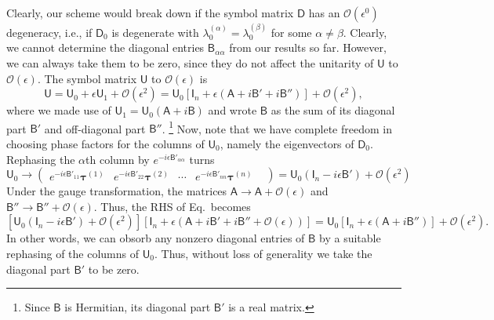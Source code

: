 Clearly, our scheme would break down if the symbol matrix $\mathsf{D}$ has an $\mathcal{O}(\epsilon^{0})$ degeneracy, i.e., if $\mathsf{D}_{0}$ is degenerate with $\lambda_{0}^{(\alpha)} = \lambda_{0}^{(\beta)}$ for some $\alpha \neq \beta$.
Clearly, we cannot determine the diagonal entries $\mathsf{B}_{\alpha\alpha}$ from our results so far.
However, we can always take them to be zero, since they do not affect the unitarity of $\mathsf{U}$ to $\mathcal{O}(\epsilon)$.
The symbol matrix $\mathsf{U}$ to $\mathcal{O}(\epsilon)$ is
%
\begin{equation}
  \mathsf{U} = \mathsf{U}_{0} + \epsilon \mathsf{U}_{1} + \mathcal{O}(\epsilon^{2}) = \mathsf{U}_{0}\left[\mathsf{I}_{n} + \epsilon\left(\mathsf{A} + i\mathsf{B}' + i\mathsf{B}'' \right)\right] + \mathcal{O}(\epsilon^{2}),
\end{equation}
%
where we made use of $\mathsf{U}_{1} = \mathsf{U}_{0}(\mathsf{A} + i\mathsf{B})$ and wrote $\mathsf{B}$ as the sum of its diagonal part $\mathsf{B}'$ and off-diagonal part $\mathsf{B}''$.%
\footnote{Since $\mathsf{B}$ is Hermitian, its diagonal part $\mathsf{B}'$ is a real matrix.}
Now, note that we have complete freedom in choosing phase factors for the columns of $\mathsf{U}_{0}$, namely the eigenvectors of $\mathsf{D}_{0}$.
Rephasing the $\alpha$th column by $e^{-i\epsilon\mathsf{B}'_{\alpha\alpha}}$ turns
%
\begin{equation}
    \mathsf{U}_{0} \to
      \begin{pmatrix}
        e^{-i\epsilon\mathsf{B}'_{11}}\bm{\tau}^{(1)} &
        e^{-i\epsilon\mathsf{B}'_{22}}\bm{\tau}^{(2)} &
        \cdots &
        e^{-i\epsilon\mathsf{B}'_{nn}}\bm{\tau}^{(n)} &
      \end{pmatrix}
      = \mathsf{U}_{0}(\mathsf{I}_{n} - i\epsilon\mathsf{B}') + \mathcal{O}(\epsilon^{2})
\end{equation}
%
Under the gauge transformation, the matrices $\mathsf{A} \to \mathsf{A} + \mathcal{O}(\epsilon)$ and $\mathsf{B}'' \to \mathsf{B}'' + \mathcal{O}(\epsilon)$.
Thus, the RHS of Eq.~\fixme becomes
%
\begin{equation}
  \left[\mathsf{U}_{0}(\mathsf{I}_{n} - i\epsilon\mathsf{B}') + \mathcal{O}(\epsilon^{2})\right]\left[\mathsf{I}_{n} + \epsilon\left(\mathsf{A} + i\mathsf{B}' + i\mathsf{B}'' + \mathcal{O}(\epsilon)\right)\right]
  =
  \mathsf{U}_{0}\left[\mathsf{I}_{n} + \epsilon\left(\mathsf{A} + i\mathsf{B}'' \right)\right] + \mathcal{O}(\epsilon^{2}).
\end{equation}
%
In other words, we can obsorb any nonzero diagonal entries of $\mathsf{B}$ by a suitable rephasing of the columns of $\mathsf{U}_{0}$.
Thus, without loss of generality we take the diagonal part $\mathsf{B}'$ to be zero.

